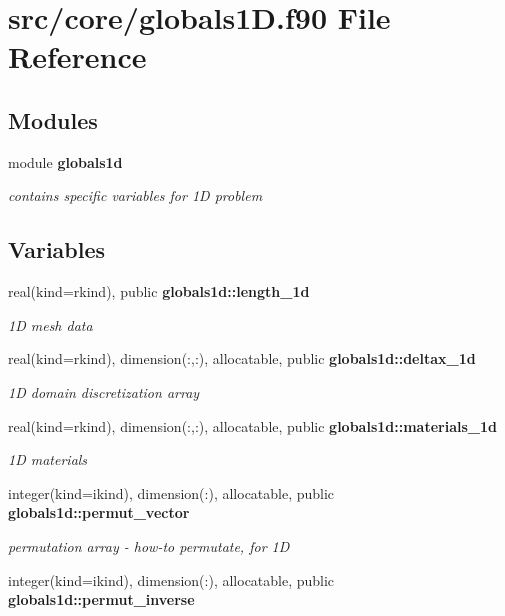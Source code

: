 \section{src/core/globals1D.f90 File Reference}
\label{globals1_d_8f90}
\subsection*{Modules}
\begin{DoxyCompactItemize}
\item 
module {\bf globals1d}
\begin{DoxyCompactList}\small\item\em contains specific variables for 1D problem \end{DoxyCompactList}\end{DoxyCompactItemize}
\subsection*{Variables}
\begin{DoxyCompactItemize}
\item 
real(kind=rkind), public {\bf globals1d\+::length\+\_\+1d}
\begin{DoxyCompactList}\small\item\em 1D mesh data \end{DoxyCompactList}\item 
real(kind=rkind), dimension(\+:,\+:), allocatable, public {\bf globals1d\+::deltax\+\_\+1d}
\begin{DoxyCompactList}\small\item\em 1D domain discretization array \end{DoxyCompactList}\item 
real(kind=rkind), dimension(\+:,\+:), allocatable, public {\bf globals1d\+::materials\+\_\+1d}
\begin{DoxyCompactList}\small\item\em 1D materials \end{DoxyCompactList}\item 
integer(kind=ikind), dimension(\+:), allocatable, public {\bf globals1d\+::permut\+\_\+vector}
\begin{DoxyCompactList}\small\item\em permutation array -\/ how-\/to permutate, for 1D \end{DoxyCompactList}\item 
integer(kind=ikind), dimension(\+:), allocatable, public {\bf globals1d\+::permut\+\_\+inverse}
\end{DoxyCompactItemize}

